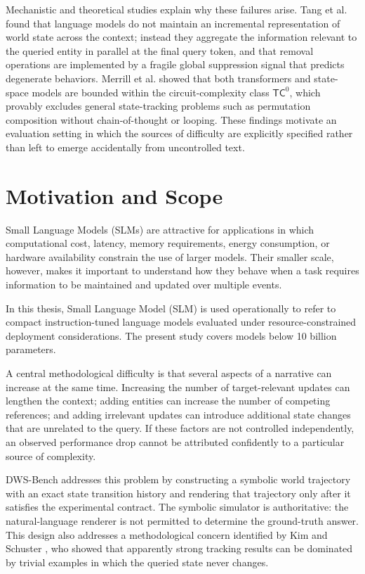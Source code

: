 \documentclass{iutbscthesis}
\begin{document}
Mechanistic and theoretical studies explain why these failures arise. Tang et al. \cite{tang2026track}
found that language models do not maintain an incremental representation of world state across the
context; instead they aggregate the information relevant to the queried entity in parallel at the final
query token, and that removal operations are implemented by a fragile global suppression signal that
predicts degenerate behaviors. Merrill et al. \cite{merrill2024illusion} showed that both transformers
and state-space models are bounded within the circuit-complexity class $\mathsf{TC}^0$, which
provably excludes general state-tracking problems such as permutation composition without
chain-of-thought or looping. These findings motivate an evaluation setting in which the sources of
difficulty are explicitly specified rather than left to emerge accidentally from uncontrolled text.


\section{Motivation and Scope}
Small Language Models (SLMs) are attractive for applications in which computational cost,
latency, memory requirements, energy consumption, or hardware availability constrain the use of
larger models. Their smaller scale, however, makes it important to understand how they behave when
a task requires information to be maintained and updated over multiple events.

In this thesis, Small Language Model (SLM) is used operationally to refer to compact instruction-tuned
language models evaluated under resource-constrained deployment considerations. The present study
covers models below 10 billion parameters.

A central methodological difficulty is that several aspects of a narrative can increase at the same
time. Increasing the number of target-relevant updates can lengthen the context; adding entities can
increase the number of competing references; and adding irrelevant updates can introduce additional
state changes that are unrelated to the query. If these factors are not controlled independently,
an observed performance drop cannot be attributed confidently to a particular source of complexity.

DWS-Bench addresses this problem by constructing a symbolic world trajectory with an exact state
transition history and rendering that trajectory only after it satisfies the experimental contract.
The symbolic simulator is authoritative: the natural-language renderer is not permitted to determine
the ground-truth answer. This design also addresses a methodological concern identified by Kim and
Schuster \cite{kim2023entity}, who showed that apparently strong tracking results can be dominated by
trivial examples in which the queried state never changes.
\end{document}
